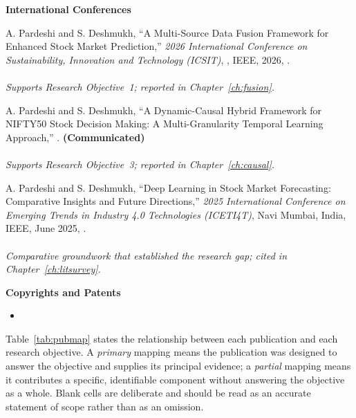 \vspace{0.4em}
\textbf{International Conferences}

\begin{enumerate}[label={[P\arabic*]},leftmargin=2.9em]
\item A. Pardeshi and S. Deshmukh, ``A Multi-Source Data Fusion Framework for Enhanced Stock
Market Prediction,'' \emph{2026 International Conference on Sustainability, Innovation and
Technology (ICSIT)}, \ICSITVenue, IEEE, 2026, \ICSITPages.\\
\link{\ICSITURL}\\
\textit{Supports Research Objective~1; reported in Chapter~\ref{ch:fusion}.}

\item A. Pardeshi and S. Deshmukh, ``A Dynamic-Causal Hybrid Framework for NIFTY50 Stock
Decision Making: A Multi-Granularity Temporal Learning Approach,'' \DCHFVenue.
\textbf{(Communicated)}\\
\link{\DCHFURL}\\
\textit{Supports Research Objective~3; reported in Chapter~\ref{ch:causal}.}
\setcounter{enumi}{5}
\item A. Pardeshi and S. Deshmukh, ``Deep Learning in Stock Market Forecasting: Comparative
Insights and Future Directions,'' \emph{2025 International Conference on Emerging Trends in
Industry 4.0 Technologies (ICETI4T)}, Navi Mumbai, India, IEEE, June 2025, \ICETIPages.\\
\link{\ICETIURL}\\
\textit{Comparative groundwork that established the research gap; cited in
Chapter~\ref{ch:litsurvey}.}
\end{enumerate}

\ifHasIPR
\vspace{0.4em}
\textbf{Copyrights and Patents}

\begin{itemize}
\item \IPRentries
\end{itemize}
\fi

\vspace{0.8em}
Table~\ref{tab:pubmap} states the relationship between each publication and each research
objective. A \emph{primary} mapping means the publication was designed to answer the objective and
supplies its principal evidence; a \emph{partial} mapping means it contributes a specific,
identifiable component without answering the objective as a whole. Blank cells are deliberate and
should be read as an accurate statement of scope rather than as an omission.

